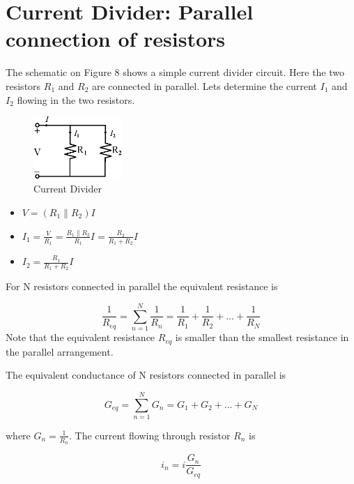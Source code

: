 \documentclass[a4 paper]{article}
\numberwithin{equation}{section}
\newcommand{\0}{\mathbf{0}}
\begin{document}
\section{Current Divider: Parallel connection of resistors}
The schematic on Figure 8 shows a simple current divider circuit. Here the two resistors $R_1$ and $R_2$ are connected in parallel. Lets determine the current $I_1$ and $I_2$ flowing in the two resistors.

\begin{figure}[ht!]
  \caption{Current Divider}
  \centering
  \includegraphics[width=0.3\textwidth]{./images/circuit1/append_end2_2}
\end{figure}
\begin{itemize} \itemsep1pt \parskip0pt 
  \item[] \hspace{6 cm}$V = (R_1 \parallel R_2)I$
  \item[] \hspace{6 cm}$I_1 = \frac{V}{R_1} = \frac{R_1\parallel R_2}{R_1}I = \frac{R_2}{R_1+R_2}I$
  \item[] \hspace{6 cm}$I_2 = \frac{R_1}{R_1 + R_2}I$
\end{itemize}
\vspace{8 mm}

For N resistors connected in parallel the equivalent resistance is 

\begin{equation}
\frac{1}{R_{eq}} = \sum_{n=1}^{N}\frac{1}{R_n}=\frac{1}{R_1}+\frac{1}{R_2}+...+\frac{1}{R_N}
\end{equation}
Note that the equivalent resistance $R_{eq}$ is smaller than the smallest resistance in the parallel arrangement.  

The equivalent conductance of  N resistors connected in parallel is  

\begin{equation}
G_{eq} = \sum_{n=1}^{N}G_n=G_1+G_2+...+G_N
\end{equation}

where $G_n = \frac{1}{R_n}$. The current flowing through resistor $R_n$ is 

\begin{equation}
i_n = i\frac{G_n}{G_{eq}}
\end{equation}
\end{document}
